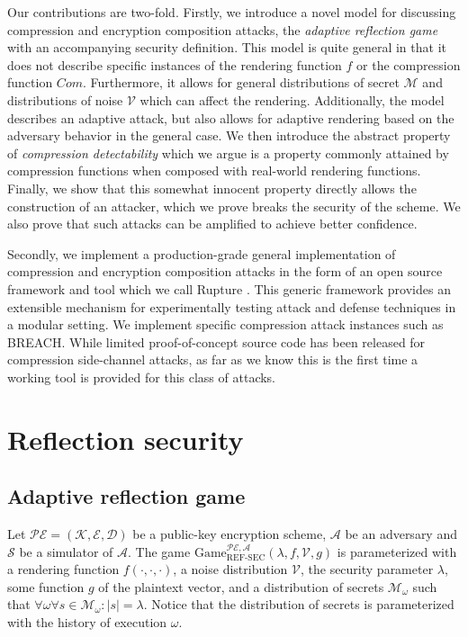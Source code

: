 \documentclass{sig-alternate-05-2015}
\begin{document}
Our contributions are two-fold. Firstly, we introduce a novel model for discussing
compression and encryption composition attacks, the \textit{adaptive reflection
game} with an accompanying security definition. This model is quite general in
that it does not describe specific instances of the rendering function $f$ or
the compression function $Com$. Furthermore, it allows for general distributions
of secret $\mathcal{M}$ and distributions of noise $\mathcal{V}$ which can
affect the rendering. Additionally, the model describes an adaptive attack,
but also allows for adaptive rendering based on the adversary behavior in the
general case. We then introduce the abstract property of \textit{compression detectability}
which we argue is a property commonly attained by compression functions when
composed with real-world rendering functions. Finally, we show that this somewhat
innocent property directly allows the construction of an attacker, which we
prove breaks the security of the scheme. We also prove that such
attacks can be amplified to achieve better confidence.

Secondly, we implement a production-grade general implementation of compression
and encryption composition attacks in the form of an open source framework and
tool which we call Rupture \cite{c7}. This generic framework provides an
extensible mechanism for experimentally testing attack and defense techniques
in a modular setting. We implement specific compression attack instances such
as BREACH. While limited proof-of-concept source code has been released for
compression side-channel attacks, as far as we know this is the first time
a working tool is provided for this class of attacks.

\section{Reflection security}\label{sec:refsec}

\subsection{Adaptive reflection game}\label{subsec:refsecgame}

Let $\mathcal{PE} = (\mathcal{K}, \mathcal{E}, \mathcal{D})$ be a public-key
encryption scheme, $\mathcal{A}$ be an adversary and $\mathcal{S}$ be a
simulator of $\mathcal{A}$.  The game
$\text{Game}_{\text{REF-SEC}}^{\mathcal{PE},\mathcal{A}}(\lambda,  f,
\mathcal{V}, g)$ is parameterized with a rendering function $f(\cdot, \cdot,
\cdot)$, a noise distribution $\mathcal{V}$, the security parameter $\lambda$,
some function $g$ of the plaintext vector, and a distribution of secrets $\mathcal{M}_\omega$
such that $\forall \omega \forall s \in \mathcal{M}_\omega: |s| = \lambda$. Notice
that the distribution of secrets is parameterized with the history of execution
$\omega$.
\end{document}
